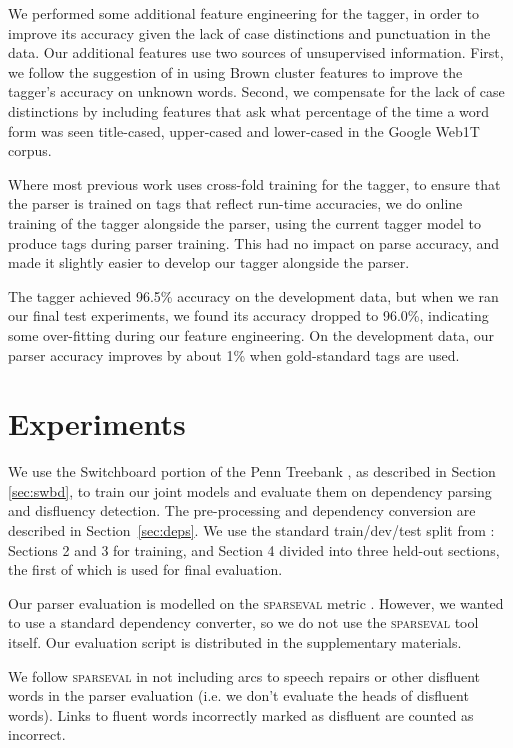 \documentclass[11pt,letterpaper]{article}
\newcommand{\sparseval}{\textsc{sparseval}\xspace}
\begin{document}
We performed some additional feature engineering for the tagger, in order to
improve its accuracy given the lack of case distinctions and punctuation in
the data. Our additional features use two sources of unsupervised information.
First, we follow the suggestion of \citet{manning:11} in using Brown cluster
features to improve the tagger's accuracy on unknown words. Second, we compensate
for the lack of case distinctions by including features that ask what percentage
of the time a word form was seen title-cased, upper-cased and lower-cased in the
Google Web1T corpus. 

Where most previous work uses cross-fold training for the tagger, to ensure that the
parser is trained on tags that reflect run-time accuracies, we do online training
of the tagger alongside the parser, using the current tagger model to produce
tags during parser training.  This had no impact on parse accuracy, and made it
slightly easier to develop our tagger alongside the parser.

The tagger achieved 96.5\% accuracy on the development data, but when we ran our
final test experiments, we found its accuracy dropped to 96.0\%, indicating
some over-fitting during our feature engineering.  On the development data,
our parser accuracy improves by about 1\% when gold-standard tags are used.

\section{Experiments}

We use the Switchboard portion of the Penn Treebank \citep{marcus:93}, as
described in Section \ref{sec:swbd}, to train our joint
models and evaluate them on dependency parsing and disfluency detection. The
pre-processing and dependency conversion are described in Section~\ref{sec:deps}.
We use the standard train/dev/test split from \citet{Charniak01a}: Sections 2
and 3 for training, and Section 4 divided into three held-out sections, the first
of which is used for final evaluation.

Our parser evaluation is modelled on the \sparseval metric \citep{sparseval}.
However, we wanted to use a standard dependency converter, so we
do not use the \sparseval tool itself.  Our evaluation script is distributed
in the supplementary materials.

We follow \sparseval in not including arcs to speech repairs or other disfluent
words in the parser evaluation (i.e. we don't evaluate the heads of disfluent
words).  Links to fluent words incorrectly marked as disfluent are counted as
incorrect.  
\end{document}
